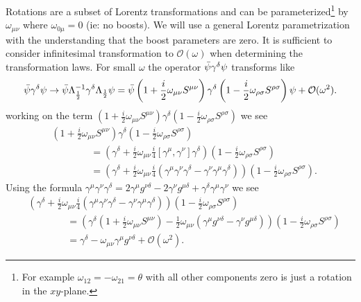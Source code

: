 Rotations are a subset of Lorentz transformations and can be parameterized\footnote{For example $\omega_{12} = -\omega_{21} = \theta$ with all other components zero is just a rotation in the $xy$-plane.} by $\omega_{\mu\nu}$ where $\omega_{0\mu} = 0$ (ie: no boosts).  We will use a general Lorentz parametrization with the understanding that the boost parameters are zero. It is sufficient to consider infinitesimal transformation to $\mathcal{O}(\omega)$ when determining the transformation laws. For small $\omega$ the operator $\bar{\psi} \gamma^\delta \psi$ transforms like 
\begin{equation*}
\bar{\psi} \gamma^\delta \psi \rightarrow \bar{\psi}\Lambda^{-1}_{\frac{1}{2}}\gamma^{\delta}\Lambda_{\frac{1}{2}}\psi = \bar{\psi}\left(1 + \frac{i}{2}\omega_{\mu\nu}S^{\mu\nu}\right)\gamma^{\delta}\left(1 - \frac{i}{2}\omega_{\rho\sigma}S^{\rho\sigma}\right)\psi + \mathcal{O}(\omega^2).
\end{equation*}
working on the term $\left(1 + \frac{i}{2}\omega_{\mu\nu}S^{\mu\nu}\right)\gamma^{\delta}\left(1 - \frac{i}{2}\omega_{\rho\sigma}S^{\rho\sigma}\right)$ we see
\begin{align*}
&\left(1 + \frac{i}{2}\omega_{\mu\nu}S^{\mu\nu}\right)\gamma^{\delta}\left(1 - \frac{i}{2}\omega_{\rho\sigma}S^{\rho\sigma}\right) \\
&\qquad\qquad= \left(\gamma^{\delta} + \frac{i}{2}\omega_{\mu\nu}\frac{i}{4}\left[\gamma^{\mu},\gamma^{\nu}\right]\gamma^{\delta}\right)\left(1 - \frac{i}{2}\omega_{\rho\sigma}S^{\rho\sigma}\right) \\
&\qquad\qquad =\left(\gamma^{\delta} + \frac{i}{2}\omega_{\mu\nu}\frac{i}{4}  \left(\gamma^{\mu}\gamma^{\nu}\gamma^{\delta} - \gamma^{\nu}\gamma^{\mu}\gamma^{\delta}  \right) \right)\left(1 - \frac{i}{2}\omega_{\rho\sigma}S^{\rho\sigma}\right).
\end{align*}
Using the formula $\gamma^{\mu}\gamma^{\nu}\gamma^{\delta} = 2\gamma^{\mu}g^{\nu\delta} - 2\gamma^{\nu}g^{\mu\delta} + \gamma^{\delta}\gamma^{\mu}\gamma^{\nu}$ we see
\begin{align*}
&\left(\gamma^{\delta} + \frac{i}{2}\omega_{\mu\nu}\frac{i}{4}  \left(\gamma^{\mu}\gamma^{\nu}\gamma^{\delta} - \gamma^{\nu}\gamma^{\mu}\gamma^{\delta}  \right) \right)\left(1 - \frac{i}{2}\omega_{\rho\sigma}S^{\rho\sigma}\right) \\
&\qquad\qquad= \left(\gamma^{\delta}\left(1 + \frac{i}{2}\omega_{\mu\nu}S^{\mu\nu}\right) - \frac{1}{2}\omega_{\mu\nu}\left(\gamma^{\mu}g^{\nu\delta} - \gamma^{\nu}g^{\mu\delta}\right)\right)\left(1 - \frac{i}{2}\omega_{\rho\sigma}S^{\rho\sigma}\right) \\
&\qquad\qquad=\gamma^{\delta} - \omega_{\mu\nu}\gamma^{\mu}g^{\nu\delta} + \mathcal{O}(\omega^2).
\end{align*}

